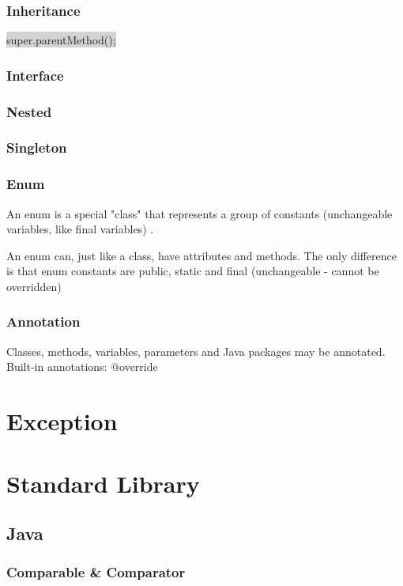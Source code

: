 \documentclass[12pt, a4paper]{report}
\begin{document}
	    \subsubsection{Inheritance}
	    \colorbox{lightgray}{super.parentMethod();}
	    \subsubsection{Interface}
	    \subsubsection{Nested}
	    \subsubsection{Singleton}
	    \subsubsection{Enum}
	    An enum is a special "class" that represents a group of constants (unchangeable variables, like final variables) \citep{javaEnum}. \par 
	    An enum can, just like a class, have attributes and methods. The only difference is that enum constants are public, static and final (unchangeable - cannot be overridden)
	    
	    \subsubsection{Annotation}
	    Classes, methods, variables, parameters and Java packages may be annotated.
	    Built-in annotations:
	    @override
	
\section{Exception}


\section{Standard Library}
    \subsection{Java}
        \subsubsection{Comparable \& Comparator}
        
     
\end{document}
